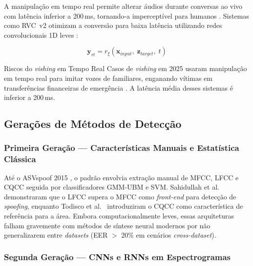 \documentclass[12pt,a4paper]{article}
\begin{document}
A manipula\c{c}\~{a}o em tempo real permite alterar \'{a}udios durante
conversas ao vivo com lat\^{e}ncia inferior a 200\,ms, tornando-a
impercept\'{i}vel para humanos \cite{pindrop2025}.
Sistemas como RVC~v2 otimizam a convers\~{a}o para baixa lat\^{e}ncia
utilizando redes convolucionais 1D leves \cite{bird2023realtime}:

\begin{equation}
\mathbf{y}_{rt} = r_{\xi}(\mathbf{x}_{input},\; \mathbf{z}_{target},\; t)
\end{equation}

\begin{warningbox}{Riscos do \textit{vishing} em Tempo Real}
Casos de \textit{vishing} em 2025 usaram manipula\c{c}\~{a}o em tempo real
para imitar vozes de familiares, enganando v\'{i}timas em transfer\^{e}ncias
financeiras de emerg\^{e}ncia \cite{pindrop2025}. A lat\^{e}ncia m\'{e}dia
desses sistemas \'{e} inferior a 200\,ms.
\end{warningbox}

\subsection{Gera\c{c}\~{o}es de M\'{e}todos de Detec\c{c}\~{a}o}

\subsubsection{Primeira Gera\c{c}\~{a}o --- Caracter\'{i}sticas Manuais e
Estat\'{i}stica Cl\'{a}ssica}

At\'{e} o ASVspoof 2015 \cite{todisco2019asvspoof}, o padr\~{a}o envolvia
extra\c{c}\~{a}o manual de MFCC, LFCC e CQCC seguida por classificadores
GMM-UBM e SVM.
Sahidullah et al.\ \cite{sahidullah2015comparison} demonstraram que o LFCC
supera o MFCC como \textit{front-end} para detec\c{c}\~{a}o de
\textit{spoofing}, enquanto Todisco et al.\ \cite{todisco2016new} introduziram
o CQCC como caracter\'{i}stica de refer\^{e}ncia para a \'{a}rea.
Embora computacionalmente leves, essas arquiteturas falham gravemente com
m\'{e}todos de s\'{i}ntese neural modernos por n\~{a}o generalizarem entre
\textit{datasets} (EER $>$ 20\% em cen\'{a}rios \textit{cross-dataset}).

\subsubsection{Segunda Gera\c{c}\~{a}o --- CNNs e RNNs em Espectrogramas}
\end{document}
